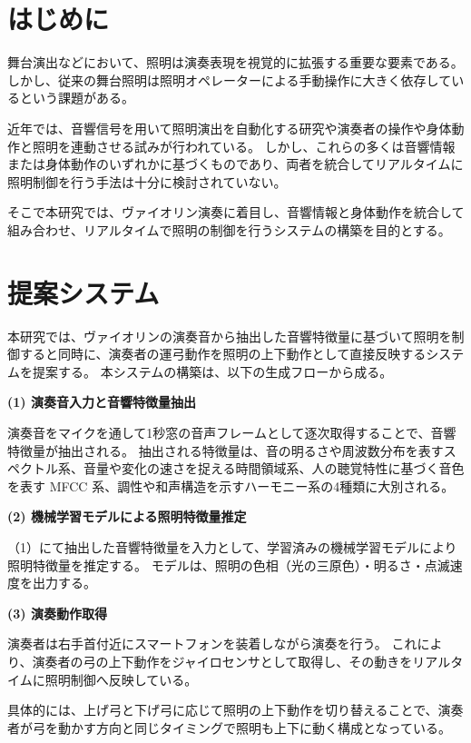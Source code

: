 \section{はじめに}

舞台演出などにおいて、照明は演奏表現を視覚的に拡張する重要な要素である。
しかし、従来の舞台照明は照明オペレーターによる手動操作に大きく依存しているという課題がある。

近年では、音響信号を用いて照明演出を自動化する研究\cite{tsukihigashi25}や演奏者の操作や身体動作と照明を連動させる試み\cite{asada20}が行われている。
しかし、これらの多くは音響情報または身体動作のいずれかに基づくものであり、両者を統合してリアルタイムに照明制御を行う手法は十分に検討されていない。

そこで本研究では、ヴァイオリン演奏に着目し、音響情報と身体動作を統合して組み合わせ、リアルタイムで照明の制御を行うシステムの構築を目的とする。

\section{提案システム} 

本研究では、ヴァイオリンの演奏音から抽出した音響特徴量に基づいて照明を制御すると同時に、演奏者の運弓動作を照明の上下動作として直接反映するシステムを提案する。
本システムの構築は、以下の生成フローから成る。

\noindent \textbf{(1) 演奏音入力と音響特徴量抽出}

演奏音をマイクを通して1秒窓の音声フレームとして逐次取得することで、音響特徴量が抽出される。
抽出される特徴量は、音の明るさや周波数分布を表すスペクトル系、音量や変化の速さを捉える時間領域系、人の聴覚特性に基づく音色を表す MFCC 系、調性や和声構造を示すハーモニー系の4種類に大別される。

\noindent \textbf{(2) 機械学習モデルによる照明特徴量推定}

（1）にて抽出した音響特徴量を入力として、学習済みの機械学習モデルにより照明特徴量を推定する。
モデルは、照明の色相（光の三原色）・明るさ・点滅速度を出力する。

\noindent \textbf{(3) 演奏動作取得}

演奏者は右手首付近にスマートフォンを装着しながら演奏を行う。
これにより、演奏者の弓の上下動作をジャイロセンサとして取得し、その動きをリアルタイムに照明制御へ反映している。

具体的には、上げ弓と下げ弓に応じて照明の上下動作を切り替えることで、演奏者が弓を動かす方向と同じタイミングで照明も上下に動く構成となっている。

